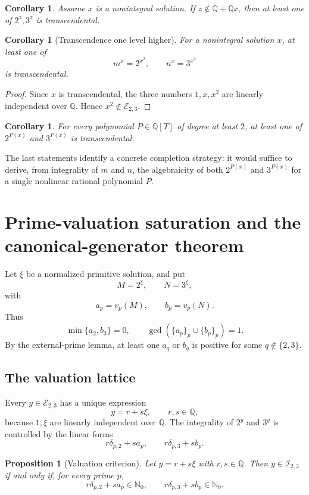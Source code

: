 \documentclass[11pt,oneside]{article}
\newtheorem{proposition}[theorem]{Proposition}
\newtheorem{corollary}[theorem]{Corollary}
\theoremstyle{definition}
\newcommand{\N}{\mathbb N}
\newcommand{\Q}{\mathbb Q}
\newcommand{\Espace}{\mathscr E_{2,3}}
\newcommand{\Ispace}{\mathscr I_{2,3}}
\begin{document}
\begin{corollary}
Assume $x$ is a nonintegral solution.  If $z\notin\Q+\Q x$, then at least one of $2^z,3^z$ is transcendental.
\end{corollary}

\begin{corollary}[Transcendence one level higher]
For a nonintegral solution $x$, at least one of
\[
  m^x=2^{x^2},\qquad n^x=3^{x^2}
\]
is transcendental.
\end{corollary}

\begin{proof}
Since $x$ is transcendental, the three numbers $1,x,x^2$ are linearly independent over $\Q$.  Hence $x^2\notin\Espace$.
\end{proof}

\begin{corollary}
For every polynomial $P\in\Q[T]$ of degree at least $2$, at least one of $2^{P(x)}$ and $3^{P(x)}$ is transcendental.
\end{corollary}

The last statements identify a concrete completion strategy: it would suffice to derive, from integrality of $m$ and $n$, the algebraicity of both $2^{P(x)}$ and $3^{P(x)}$ for a single nonlinear rational polynomial $P$.

\section{Prime-valuation saturation and the canonical-generator theorem}

Let $\xi$ be a normalized primitive solution, and put
\[
 M=2^\xi,\qquad N=3^\xi,
\]
with
\[
 a_p=v_p(M),\qquad b_p=v_p(N).
\]
Thus
\[
 \min\{a_2,b_3\}=0,
 \qquad
 \gcd(\{a_p\}_p\cup\{b_p\}_p)=1.
\]
By the external-prime lemma, at least one $a_q$ or $b_q$ is positive for some $q\notin\{2,3\}$.

\subsection{The valuation lattice}

Every $y\in\Espace$ has a unique expression
\[
  y=r+s\xi,
  \qquad r,s\in\Q,
\]
because $1,\xi$ are linearly independent over $\Q$.  The integrality of $2^y$ and $3^y$ is controlled by the linear forms
\[
  r\delta_{p,2}+s a_p,
  \qquad
  r\delta_{p,3}+s b_p.
\]

\begin{proposition}[Valuation criterion]
Let $y=r+s\xi$ with $r,s\in\Q$.  Then $y\in\Ispace$ if and only if, for every prime $p$,
\[
 r\delta_{p,2}+s a_p\in\N_0,
 \qquad
 r\delta_{p,3}+s b_p\in\N_0.
\]
\end{proposition}
\end{document}
